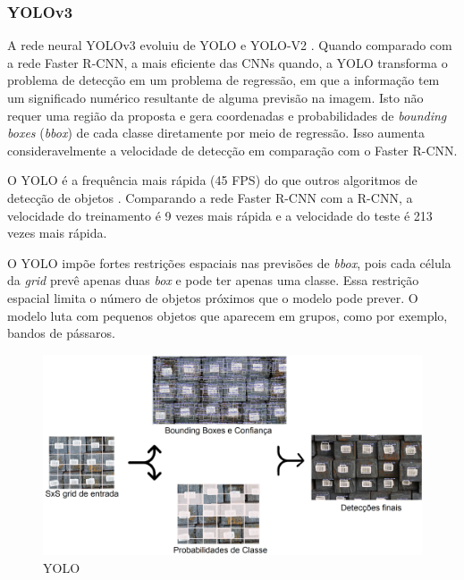 
\subsubsection*{YOLOv3}\label{sub:Yolov3}

A rede neural YOLOv3 evoluiu de YOLO e YOLO-V2 \cite{redmon2018yolov3}. Quando comparado com a rede Faster R-CNN, a mais eficiente das CNNs quando, a YOLO transforma o problema de detecção em um problema de regressão, em que a informação tem um significado numérico resultante de alguma previsão na imagem. Isto não requer uma região da proposta e gera coordenadas e probabilidades de \textit{bounding boxes} (\textit{bbox}) de cada classe diretamente por meio de regressão. Isso aumenta consideravelmente a velocidade de detecção em comparação com o Faster R-CNN.\cite{yolov3_apple}

O YOLO é a frequência mais rápida (45 FPS) do que outros algoritmos de detecção de objetos \cite{yolov3RealTime}. Comparando a rede Faster R-CNN com a  R-CNN, a velocidade do treinamento  é 9 vezes mais rápida e a velocidade do teste é 213 vezes mais rápida. \cite{7960069}

O YOLO impõe fortes restrições espaciais nas previsões de \textit{bbox}, pois cada célula da \textit{grid} prevê apenas duas \textit{box} e pode ter apenas uma classe. Essa restrição espacial limita o número de objetos próximos que o modelo pode prever. O modelo luta com pequenos objetos que aparecem em grupos, como por exemplo, bandos de pássaros. \cite{yolov3RealTime}

\begin{figure}[htbp]
		\centering
		\includegraphics[scale=0.2]{figuras/MachineLearning/yolo.png}
		\caption{YOLO}
		\label{fig:yolo}
\end{figure}

